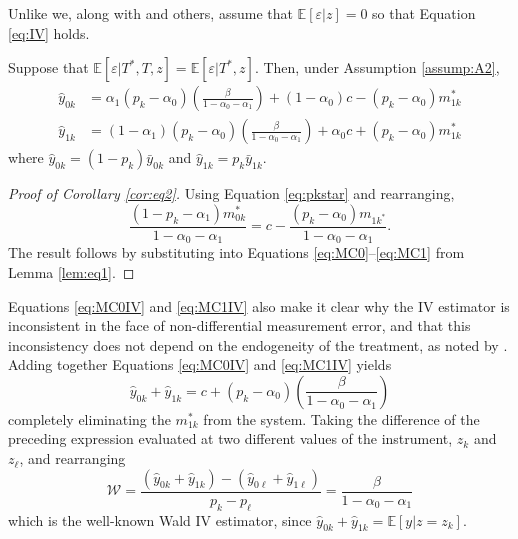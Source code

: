 Unlike \cite{Lewbel} we, along with \cite{Mahajan} and others, assume that $\mathbb{E}[\varepsilon|z]=0$ so that Equation \ref{eq:IV} holds. 
\begin{cor}
  \label{cor:eq2}
  Suppose that $\mathbb{E}\left[ \varepsilon|T^*,T,z \right]= \mathbb{E}\left[ \varepsilon|T^*,z \right]$. Then, under Assumption \ref{assump:A2},
\begin{align}
  \label{eq:MC0IV}
  \hat{y}_{0k} &=\alpha_1(p_k - \alpha_0)\left(\frac{\beta}{1 - \alpha_0 - \alpha_1}\right) + (1-\alpha_0)c - (p _k -  \alpha_0)m_{1k}^* \\[1.5ex]
  \label{eq:MC1IV}
  \hat{y}_{1k} &=(1-\alpha_1)(p_k - \alpha_0)\left(\frac{\beta}{1 - \alpha_0 - \alpha_1}\right) + \alpha_0 c + (p _k -  \alpha_0)m_{1k}^*
\end{align}
where $\hat{y}_{0k} = (1-p_k)\bar{y}_{0k}$ and $\hat{y}_{1k}= p_k \bar{y}_{1k}$.
\end{cor}
\begin{proof}[Proof of Corollary \ref{cor:eq2}]
Using Equation \ref{eq:pkstar} and rearranging, 
\begin{equation*}
  \frac{(1 - p_k - \alpha_1) m_{0k}^*}{1 - \alpha_0 - \alpha_1} = c - \frac{(p_k - \alpha_0)m_{1k^*}}{1 - \alpha_0 - \alpha_1}.
\end{equation*}
The result follows by substituting into Equations \ref{eq:MC0}--\ref{eq:MC1} from Lemma \ref{lem:eq1}.
\end{proof}
Equations \ref{eq:MC0IV} and \ref{eq:MC1IV} also make it clear why the IV estimator is inconsistent in the face of non-differential measurement error, and that this inconsistency does not depend on the endogeneity of the treatment, as noted by \cite{FL}.
Adding together Equations \ref{eq:MC0IV} and \ref{eq:MC1IV} yields
\begin{equation*}
  \hat{y}_{0k} + \hat{y}_{1k} = c + (p_k - \alpha_0)\left( \frac{\beta}{1 - \alpha_0 - \alpha_1} \right) 
\end{equation*}
completely eliminating the $m^*_{1k}$ from the system.
Taking the difference of the preceding expression evaluated at two different values of the instrument, $z_{k}$ and $z_{\ell}$, and rearranging
\begin{equation}
  \mathcal{W} = \frac{(\hat{y}_{0k} + \hat{y}_{1k}) - (\hat{y}_{0\ell} + \hat{y}_{1\ell})}{p_k - p_\ell} =  \frac{\beta}{1 - \alpha_0 - \alpha_1}
  \label{eq:wald}
\end{equation}
which is the well-known Wald IV estimator, since $\hat{y}_{0k} + \hat{y}_{1k} = \mathbb{E}[y|z = z_k]$.

